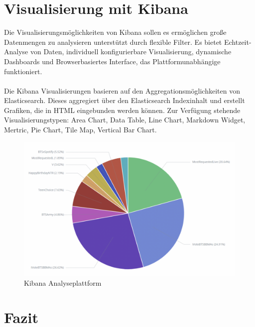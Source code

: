 \section{Visualisierung mit Kibana}
Die Visualisierungsmöglichkeiten von Kibana sollen es ermöglichen große Datenmengen zu analysieren unterstützt durch flexible Filter. Es bietet Echtzeit-Analyse von Daten, individuell konfigurierbare Visualisierung, dynamische Dashboards und Browserbasiertes Interface, das Plattformunabhängige funktioniert.\\\\
Die Kibana Visualisierungen basieren auf den Aggregationsmöglichkeiten von Elasticsearch. Dieses aggregiert über den Elasticsearch Indexinhalt und erstellt Grafiken, die in HTML eingebunden werden können. Zur Verfügung stehende Visualisierungstypen: Area Chart, Data Table, Line Chart, Markdown Widget, Mertric, Pie Chart, Tile Map, Vertical Bar Chart.
\begin{figure}[htbp!]
  \includegraphics[scale=0.4]{material/architecture/kibana.png}
  \caption{Kibana Analyseplattform} 
  \label{fig:Kibana}
\end{figure}

\section{Fazit}
